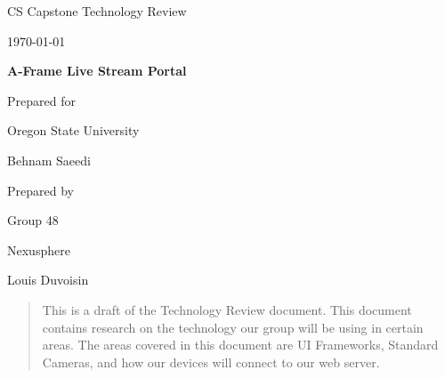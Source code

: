 \documentclass[onecolumn, draftclsnofoot,10pt, compsoc]{IEEEtran}
\def \CapstoneTeamName{		Nexusphere}
\def \CapstoneTeamNumber{		48}
\def \GroupMemberOne{			Louis Duvoisin}
\def \CapstoneProjectName{		A-Frame Live Stream Portal}
\def \CapstoneSponsorCompany{	Oregon State University}
\def \CapstoneSponsorPerson{		Behnam Saeedi}
\def \DocType{	%
				Technology Review
				}
\newcommand{\NameSigPair}[1]{\par
\makebox[2.75in][r]{#1} \hfil 	\makebox[3.25in]{\makebox[2.25in]{\hrulefill} \hfill		\makebox[.75in]{\hrulefill}}
\par\vspace{-12pt} \textit{\tiny\noindent
\makebox[2.75in]{} \hfil		\makebox[3.25in]{\makebox[2.25in][r]{Signature} \hfill	\makebox[.75in][r]{Date}}}}
\renewcommand{\NameSigPair}[1]{#1}
\begin{document}
\begin{titlepage}
    \begin{singlespace}
        \hfill 
        \par\vspace{.2in}
        \centering
        \scshape{
            \huge CS Capstone \DocType \par
            {\large\today}\par
            \vspace{.5in}
            \textbf{\Huge\CapstoneProjectName}\par
            \vfill
            {\large Prepared for}\par
            \Huge \CapstoneSponsorCompany\par
            \vspace{5pt}
            {\Large\NameSigPair{\CapstoneSponsorPerson}\par}
            {\large Prepared by }\par
            Group\CapstoneTeamNumber\par
            \CapstoneTeamName\par 
            \vspace{5pt}
            {\Large
                \NameSigPair{\GroupMemberOne}\par
            }
            \vspace{20pt}
        }
        \begin{abstract}
        	This is a draft of the Technology Review document. This document contains research on the technology our group will be using in certain areas. The areas covered in this document are UI Frameworks, Standard Cameras, and how our devices will connect to our web server.
        \end{abstract}   	 
    \end{singlespace}
\end{titlepage}
\newpage
{}
\tableofcontents
\clearpage
\end{document}
